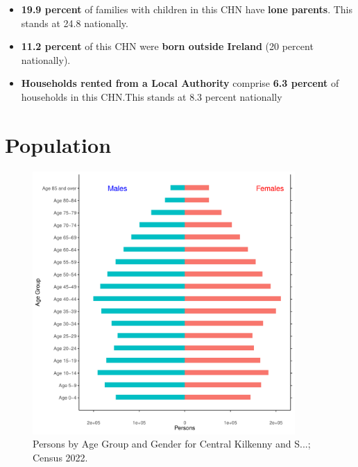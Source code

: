 \documentclass{article}
\begin{document}
\begin{itemize}
\item \textbf{19.9 percent} of families with children in this CHN have \textbf{lone parents}. This stands at 24.8 nationally.

\item \textbf{11.2 percent} of this CHN were \textbf{born outside Ireland} (20 percent nationally).

\item \textbf{Households rented from a Local Authority} comprise \textbf{6.3 percent} of households in this CHN.This stands at 8.3 percent nationally

\end{itemize}

\pagebreak

\section{Population} 
\label{sect:Pop}

\begin{figure}[h]
	\centering
	\includegraphics[width = 100mm]{../figures/PyramidPlot.pdf}
	\caption{Persons by Age Group and Gender for Central Kilkenny and S...; Census 2022.}
	\label{fig:2ae19629-1a6a-13a3-e055-000000000001}
	\end{figure}
\end{document}
